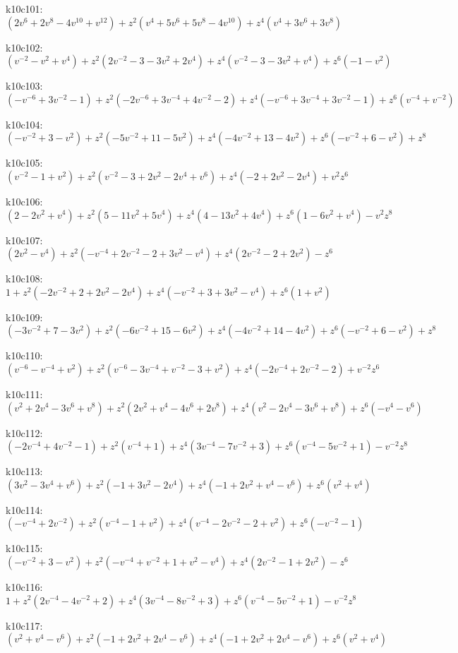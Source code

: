k10c101: $ (2v^{6}+2v^{8}-4v^{10}+v^{12})  +z^{2}(v^{4}+5v^{6}+5v^{8}-4v^{10})  +z^{4}(v^{4}+3v^{6}+3v^{8}) $ 

k10c102: $ (v^{-2}-v^{2}+v^{4})  +z^{2}(2v^{-2}-3-3v^{2}+2v^{4})  +z^{4}(v^{-2}-3-3v^{2}+v^{4})  +z^{6}(-1-v^{2}) $ 

k10c103: $ (-v^{-6}+3v^{-2}-1)  +z^{2}(-2v^{-6}+3v^{-4}+4v^{-2}-2)  +z^{4}(-v^{-6}+3v^{-4}+3v^{-2}-1)  +z^{6}(v^{-4}+v^{-2}) $ 

k10c104: $ (-v^{-2}+3-v^{2})  +z^{2}(-5v^{-2}+11-5v^{2})  +z^{4}(-4v^{-2}+13-4v^{2})  +z^{6}(-v^{-2}+6-v^{2})  +z^{8} $ 

k10c105: $ (v^{-2}-1+v^{2})  +z^{2}(v^{-2}-3+2v^{2}-2v^{4}+v^{6})  +z^{4}(-2+2v^{2}-2v^{4})  +v^{2}z^{6} $ 

k10c106: $ (2-2v^{2}+v^{4})  +z^{2}(5-11v^{2}+5v^{4})  +z^{4}(4-13v^{2}+4v^{4})  +z^{6}(1-6v^{2}+v^{4})  -v^{2}z^{8} $ 

k10c107: $ (2v^{2}-v^{4})  +z^{2}(-v^{-4}+2v^{-2}-2+3v^{2}-v^{4})  +z^{4}(2v^{-2}-2+2v^{2})  -z^{6} $ 

k10c108: $ 1  +z^{2}(-2v^{-2}+2+2v^{2}-2v^{4})  +z^{4}(-v^{-2}+3+3v^{2}-v^{4})  +z^{6}(1+v^{2}) $ 

k10c109: $ (-3v^{-2}+7-3v^{2})  +z^{2}(-6v^{-2}+15-6v^{2})  +z^{4}(-4v^{-2}+14-4v^{2})  +z^{6}(-v^{-2}+6-v^{2})  +z^{8} $ 

k10c110: $ (v^{-6}-v^{-4}+v^{2})  +z^{2}(v^{-6}-3v^{-4}+v^{-2}-3+v^{2})  +z^{4}(-2v^{-4}+2v^{-2}-2)  +v^{-2}z^{6} $ 

k10c111: $ (v^{2}+2v^{4}-3v^{6}+v^{8})  +z^{2}(2v^{2}+v^{4}-4v^{6}+2v^{8})  +z^{4}(v^{2}-2v^{4}-3v^{6}+v^{8})  +z^{6}(-v^{4}-v^{6}) $ 

k10c112: $ (-2v^{-4}+4v^{-2}-1)  +z^{2}(v^{-4}+1)  +z^{4}(3v^{-4}-7v^{-2}+3)  +z^{6}(v^{-4}-5v^{-2}+1)  -v^{-2}z^{8} $ 

k10c113: $ (3v^{2}-3v^{4}+v^{6})  +z^{2}(-1+3v^{2}-2v^{4})  +z^{4}(-1+2v^{2}+v^{4}-v^{6})  +z^{6}(v^{2}+v^{4}) $ 

k10c114: $ (-v^{-4}+2v^{-2})  +z^{2}(v^{-4}-1+v^{2})  +z^{4}(v^{-4}-2v^{-2}-2+v^{2})  +z^{6}(-v^{-2}-1) $ 

k10c115: $ (-v^{-2}+3-v^{2})  +z^{2}(-v^{-4}+v^{-2}+1+v^{2}-v^{4})  +z^{4}(2v^{-2}-1+2v^{2})  -z^{6} $ 

k10c116: $ 1  +z^{2}(2v^{-4}-4v^{-2}+2)  +z^{4}(3v^{-4}-8v^{-2}+3)  +z^{6}(v^{-4}-5v^{-2}+1)  -v^{-2}z^{8} $ 

k10c117: $ (v^{2}+v^{4}-v^{6})  +z^{2}(-1+2v^{2}+2v^{4}-v^{6})  +z^{4}(-1+2v^{2}+2v^{4}-v^{6})  +z^{6}(v^{2}+v^{4}) $ 

